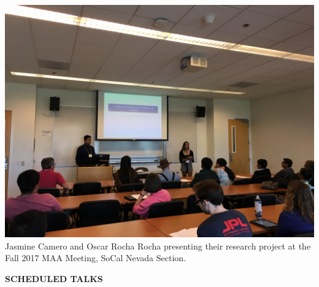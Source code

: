 \documentclass[a4paper]{article}
\begin{document}
\begin{minipage}{0.95\textwidth}
\begin{minipage}[b]{0.47\textwidth}
\rule{0pt}{32pt}
\end{minipage}\hspace{5pt}
\begin{minipage}[b]{0.47\textwidth}
\includegraphics[width=\linewidth, trim = {0 0 0 25cm}, clip]{Oscar.jpg}
Jasmine Camero and Oscar Rocha Rocha presenting their research project at the Fall 2017 MAA Meeting, SoCal Nevada Section.
\medskip
\medskip

{\large\raggedright
{\textbf{\color{csecondary}SCHEDULED TALKS}}
}\par
\normalsize
\smallskip



\end{minipage}
\end{minipage}
\end{document}
